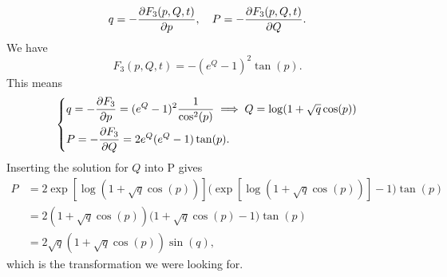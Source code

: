 \documentclass{article}
\begin{document}
    \begin{equation*}
        q = - \pdv{F_3(p, Q, t)}{p}, \quad P = - \pdv{F_3(p, Q, t)}{Q}.
    \end{equation*}
    We have
    \begin{equation*}
        F_3(p, Q, t) = -(e^Q - 1)^2 \tan(p).
    \end{equation*}
    This means
    \begin{equation*}
        \begin{dcases*}
            q = - \pdv{F_3}{p} = (e^Q - 1)^2 \frac{1}{\cos^2(p)} \implies Q = \log(1 + \sqrt q \cos(p))\\
            P = - \pdv{F_3}{Q} = 2 e^Q(e^Q - 1) \tan(p).
        \end{dcases*}
    \end{equation*}
    Inserting the solution for $Q$ into P gives
    \begin{align*}
        P&= 2 \exp\left[\log(1 + \sqrt q \cos(p))\right]\Big(\exp\left[\log(1 + \sqrt q \cos(p))\right]  -1\Big)\tan(p)  \\
        & = 2(1 + \sqrt{q} \cos(p))\Big( 1 + \sqrt q \cos(p) - 1\Big)\tan(p) \\
        & = 2 \sqrt q (1 + \sqrt q \cos(p)) \sin(q),
    \end{align*}
    which is the transformation we were looking for.
\end{document}
